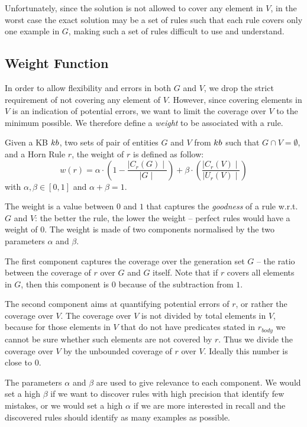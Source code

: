 Unfortunately, since the solution is not allowed to cover any element in $V$, in the worst case the exact solution may be a set of rules such that each rule covers only one example in $G$, making such a set of rules difficult to use and understand.

\subsection{Weight Function} \label{sec:krd_weight_fun}
In order to allow flexibility and errors in both $G$ and $V$, we drop the strict requirement of not covering any element of $V$. However, since covering elements in $V$ is an indication of potential errors, we want to limit the coverage over $V$ to the minimum possible. We therefore define a \emph{weight} to be associated with a rule.

\begin{definition}
	Given a KB ${\sc kb}$, two sets of pair of entities $G$ and $V$ from ${\sc kb}$ such that $G \cap V = \emptyset$, and a Horn Rule $r$, the weight of $r$ is defined as follow:
	\begin{equation} \label{eq:weight_fun}
	w(r) = \alpha \cdot (1-\frac{\mid C_{r}(G)\mid}{\mid G \mid}) +\beta \cdot (\frac{\mid C_{r}(V) \mid}{\mid U_{r}(V)\mid})
	\end{equation}
	with $\alpha,\beta \in [0,1]$ and $\alpha + \beta = 1$. 
\end{definition}
The weight is a value between $0$ and $1$ that captures the \emph{goodness} of a rule w.r.t. $G$ and $V$: the better the rule, the lower the weight -- perfect rules would have a weight of $0$. The weight is made of two components normalised by the two parameters $\alpha$ and $\beta$.
\begin{inparaenum}[\itshape1)]
	\item The first component captures the coverage over the generation set $G$ -- the ratio between the coverage of $r$ over $G$ and $G$ itself. Note that if $r$ covers all elements in $G$, then this component is $0$ because of the subtraction from $1$.
	\item The second component aims at quantifying potential errors of $r$, or rather the coverage over $V$. The coverage over $V$ is not divided by total elements in $V$, because 
	for those elements in $V$ that do not have predicates stated in $r_{body}$ we 
	cannot be sure whether such elements are not covered by $r$. Thus we divide the coverage over $V$ by the unbounded coverage of $r$ over $V$. Ideally this number is close to $0$.
\end{inparaenum}
The parameters $\alpha$ and $\beta$ are used to give relevance to each component. We would set a high $\beta$ if we want to discover rules with high precision that identify few mistakes, or we would set a high $\alpha$ if we are more interested in recall and the discovered rules should identify as many examples as possible.

